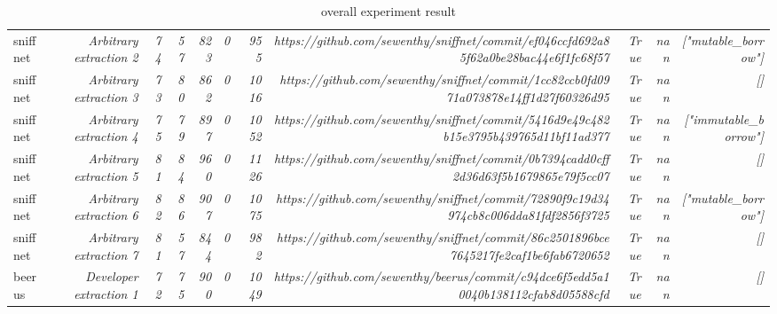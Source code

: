 \begin{landscape}
\begin{table}[]
{\begin{tabular}{lrrrrrrrrrr}
sniffnet & \textit{Arbitrary extraction 2} & \textit{74} & \textit{57} & \textit{823} & \textit{0} & \textit{955} & \textit{https://github.com/sewenthy/sniffnet/commit/ef046ccfd692a85f62a0be28bac44e6f1fc68f57} & \textit{True} & \textit{nan} & \textit{["mutable\_borrow"]} \\
sniffnet & \textit{Arbitrary extraction 3} & \textit{73} & \textit{80} & \textit{862} & \textit{0} & \textit{1016} & \textit{https://github.com/sewenthy/sniffnet/commit/1cc82ccb0fd0971a073878e14ff1d27f60326d95} & \textit{True} & \textit{nan} & \textit{[]} \\
sniffnet & \textit{Arbitrary extraction 4} & \textit{75} & \textit{79} & \textit{897} & \textit{0} & \textit{1052} & \textit{https://github.com/sewenthy/sniffnet/commit/5416d9e49c482b15e3795b439765d11bf11ad377} & \textit{True} & \textit{nan} & \textit{["immutable\_borrow"]} \\
sniffnet & \textit{Arbitrary extraction 5} & \textit{81} & \textit{84} & \textit{960} & \textit{0} & \textit{1126} & \textit{https://github.com/sewenthy/sniffnet/commit/0b7394cadd0cff2d36d63f5b1679865e79f5cc07} & \textit{True} & \textit{nan} & \textit{[]} \\
sniffnet & \textit{Arbitrary extraction 6} & \textit{82} & \textit{86} & \textit{907} & \textit{0} & \textit{1075} & \textit{https://github.com/sewenthy/sniffnet/commit/72890f9c19d34974cb8c006dda81fdf2856f3725} & \textit{True} & \textit{nan} & \textit{["mutable\_borrow"]} \\
sniffnet & \textit{Arbitrary extraction 7} & \textit{81} & \textit{57} & \textit{844} & \textit{0} & \textit{982} & \textit{https://github.com/sewenthy/sniffnet/commit/86c2501896bce7645217fe2caf1be6fab6720652} & \textit{True} & \textit{nan} & \textit{[]} \\
beerus & \textit{Developer extraction 1} & \textit{72} & \textit{75} & \textit{900} & \textit{0} & \textit{1049} & \textit{https://github.com/sewenthy/beerus/commit/c94dce6f5edd5a10040b138112cfab8d05588cfd} & \textit{True} & \textit{nan} & \textit{[]} \\ \hline
\end{tabular}%
}
\caption{\tool overall experiment result}
\label{table:overallExprResult}
\end{table}
\end{landscape}